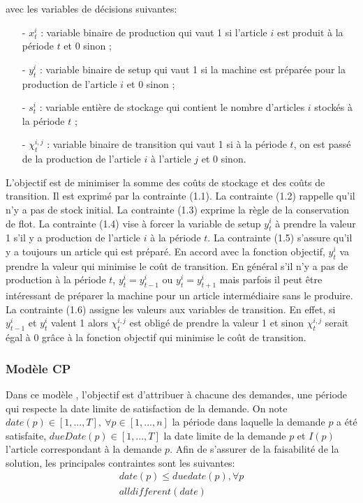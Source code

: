 		avec les variables de décisions suivantes: \\
		\begin{itemize}
			\item[-] $x_{t}^{i}$ : variable binaire de production qui vaut 1 si l’article $i$ est produit à la période $t$ et 0 sinon ;
			\item[-] $y_{t}^{i}$ : variable binaire de setup qui vaut 1 si la machine est préparée pour la production de l’article $i$ et 0 sinon ;
			\item[-] $s_{t}^{i}$ : variable entière de stockage qui contient le nombre d’articles $i$ stockés à la période $t$ ; 
			\item[-] $\chi_{t}^{i,j}$ : variable binaire de transition qui vaut 1 si à la période $t$, on est passé de la production de l’article $i$ à l’article $j$ et 0 sinon.
		\end{itemize}
		\vspace*{.3cm}
	\hspace*{.5cm} L'objectif est de minimiser la somme des coûts de stockage et des coûts de transition. Il est exprimé par la contrainte (1.1). La contrainte (1.2) rappelle qu'il n'y a pas de stock initial. La contrainte (1.3) exprime la règle de la conservation de flot. La contrainte (1.4) vise à forcer la variable de setup $y_{t}^{i}$ à prendre la valeur 1 s’il y a production de l’article $i$ à la période $t$. La contrainte (1.5) s'assure qu'il y a toujours un article qui est préparé. En accord avec la fonction objectif, $y_{t}^{i}$ va prendre la valeur qui minimise le coût de transition. En général s’il n’y a pas de production à la période $t$, $y_{t}^{i} = y_{t-1}^{i}$ ou $y_{t}^{i} = y_{t+1}^{i}$ mais parfois il peut être intéressant de préparer la machine pour un article intermédiaire sans le produire. La contrainte (1.6) assigne les valeurs aux variables de transition. En effet, si $y_{t-1}^{i}$ et $y_{t}^{i}$ valent 1 alors $\chi_{t}^{i,j}$ est obligé de prendre la valeur 1 et sinon $\chi_{t}^{i,j}$ serait égal à 0 grâce à la fonction objectif qui minimise le coût de transition.
		
		\subsubsection{Modèle CP}
		Dans ce modèle \cite{ratheil_master}, l’objectif est d’attribuer à chacune des demandes, une période qui respecte la date limite de satisfaction de la demande. On note $date(p) \in [1,...,T],\ \forall p \in [1,...,n]$ la période dans laquelle la demande $p$ a été satisfaite, $dueDate(p) \in [1,...,T]$ la date limite de la demande $p$ et $I(p)$ l'article correspondant à la demande $p$. Afin de s'assurer de la faisabilité de la solution, les principales contraintes sont les suivantes:
		\begin{eqnarray}
			date(p) \leq duedate(p), \forall p \\
			alldifferent(date)
		\end{eqnarray}
		

